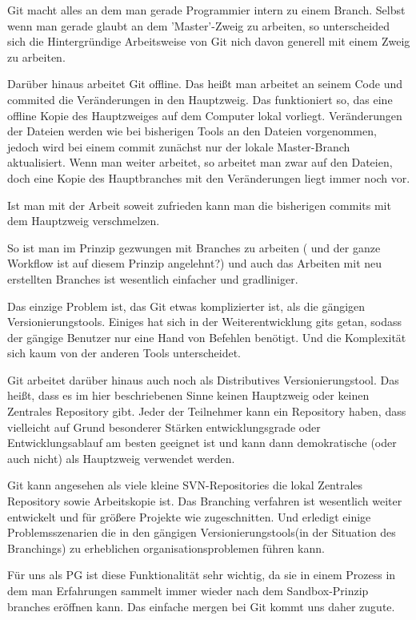 Git macht alles an dem man gerade Programmier intern zu einem Branch.
Selbst wenn man gerade glaubt an dem 'Master'-Zweig zu arbeiten, so unterscheided sich die Hintergründige Arbeitsweise von Git nich davon generell mit einem Zweig zu arbeiten.

Darüber hinaus arbeitet Git offline. Das heißt man arbeitet an seinem Code und commited die Veränderungen in den Hauptzweig.
Das funktioniert so, das eine offline Kopie des Hauptzweiges auf dem Computer lokal vorliegt. 
Veränderungen der Dateien werden wie bei bisherigen Tools an den Dateien vorgenommen, jedoch wird bei einem commit zunächst nur der lokale Master-Branch aktualisiert.
Wenn man weiter arbeitet, so arbeitet man zwar auf den Dateien, doch eine Kopie des Hauptbranches mit den Veränderungen liegt immer noch vor.

Ist man mit der Arbeit soweit zufrieden kann man die bisherigen commits mit dem Hauptzweig verschmelzen.

So ist man im Prinzip gezwungen mit Branches zu arbeiten ( und der ganze Workflow ist auf diesem Prinzip angelehnt?) und auch das Arbeiten mit neu erstellten Branches ist wesentlich einfacher und gradliniger.

Das einzige Problem ist, das Git etwas komplizierter ist, als die gängigen Versionierungstools.
Einiges hat sich in der Weiterentwicklung gits getan, sodass der gängige Benutzer nur eine Hand von Befehlen benötigt. Und die Komplexität sich kaum von der anderen Tools unterscheidet.

Git arbeitet darüber hinaus auch noch als Distributives Versionierungstool. Das heißt, dass es im hier beschriebenen Sinne keinen Hauptzweig oder keinen Zentrales Repository gibt.
Jeder der Teilnehmer kann ein Repository haben, dass vielleicht auf Grund besonderer Stärken entwicklungsgrade oder Entwicklungsablauf am besten geeignet ist und kann dann demokratische (oder auch nicht) als Hauptzweig verwendet werden.

Git kann angesehen als viele kleine SVN-Repositories die lokal Zentrales Repository sowie Arbeitskopie ist.
Das Branching verfahren ist wesentlich weiter entwickelt und für größere Projekte wie zugeschnitten. Und erledigt einige Problemsszenarien die in den gängigen Versionierungstools(in der Situation des Branchings) zu erheblichen organisationsproblemen führen kann.

Für uns als PG ist diese Funktionalität sehr wichtig, da sie in einem Prozess in dem man Erfahrungen sammelt immer wieder nach dem Sandbox-Prinzip branches eröffnen kann. Das einfache mergen bei Git kommt uns daher zugute.

